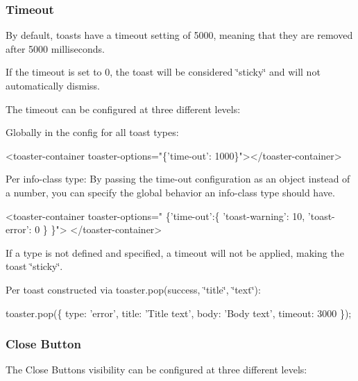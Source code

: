 \subsubsection*{Timeout}

By default, toasts have a timeout setting of 5000, meaning that they are removed after 5000 milliseconds.

If the timeout is set to 0, the toast will be considered \char`\"{}sticky\char`\"{} and will not automatically dismiss.

The timeout can be configured at three different levels\+:


\begin{DoxyItemize}
\item Globally in the config for all toast types\+: 
\begin{DoxyCode}
<toaster-container toaster-options="\{'time-out': 1000\}"></toaster-container>
\end{DoxyCode}

\item Per info-\/class type\+: By passing the time-\/out configuration as an object instead of a number, you can specify the global behavior an info-\/class type should have. 
\begin{DoxyCode}
<toaster-container toaster-options="
    \{'time-out':\{ 'toast-warning': 10, 'toast-error': 0 \} \}">
</toaster-container>
\end{DoxyCode}
 If a type is not defined and specified, a timeout will not be applied, making the toast \char`\"{}sticky\char`\"{}.
\item Per toast constructed via toaster.\+pop(\textquotesingle{}success\textquotesingle{}, \char`\"{}title\char`\"{}, \char`\"{}text\char`\"{})\+: 
\begin{DoxyCode}
toaster.pop(\{
                type: 'error',
                title: 'Title text',
                body: 'Body text',
                timeout: 3000
            \});
\end{DoxyCode}

\end{DoxyItemize}

\subsubsection*{Close Button}

The Close Button\textquotesingle{}s visibility can be configured at three different levels\+:


